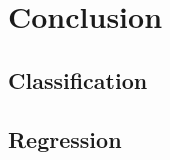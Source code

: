 \documentclass[../main.tex]{subfiles}
\begin{document}
\section{Conclusion}
\subsection{Classification}
\subsection{Regression}
\end{document}
